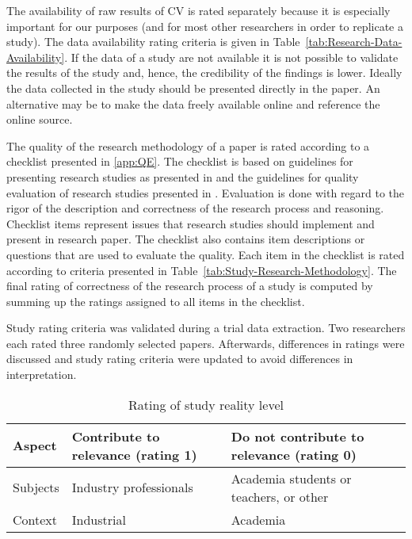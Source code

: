 The availability of raw results of CV is rated separately because it is especially important for our purposes (and for most other researchers in order to replicate a study). The data availability rating criteria is given in Table~\ref{tab:Research-Data-Availability}. If the data of a study are not available it is not possible to validate the results of the study and, hence, the credibility of the findings is lower. Ideally the data collected in the study should be presented directly in the paper. An alternative may be to make the data freely available online and reference the online source.

The quality of the research methodology of a paper is rated according to a checklist presented in \ref{app:QE}. The checklist is based on guidelines for presenting research studies as presented in \citep{Wohlin2000,Jedlitschka2005} and the guidelines for quality evaluation of research studies presented in \citep{Ivarsson2010,Kitchenham2007}. Evaluation is done with regard to the rigor of the description and correctness of the research process and reasoning. Checklist items represent issues that research studies should implement and present in research paper. The checklist also contains item descriptions or questions that are used to evaluate the quality. Each item in the checklist is rated according to criteria presented in Table~\ref{tab:Study-Research-Methodology}. The final rating of correctness of the research process of a study is computed by summing up the ratings assigned to all items in the checklist.

Study rating criteria was validated during a trial data extraction. Two researchers each rated three randomly selected papers. Afterwards, differences in ratings were discussed and study rating criteria were updated to avoid differences in interpretation.

\begin{table}
	\scriptsize
\caption{\label{tab:Study-Setting-Rating}Rating of study reality level}
\begin{tabular}{|>{\centering}p{}|>{\centering}p{}|>{\centering}p{}|}
\hline 
Aspect & Contribute to relevance (rating 1) & Do not contribute to relevance (rating 0)\tabularnewline
\hline\hline
Subjects & Industry professionals & Academia students or teachers, or other\tabularnewline
\hline 
Context & Industrial & Academia\tabularnewline
\hline 
\end{tabular}%
\end{table}

